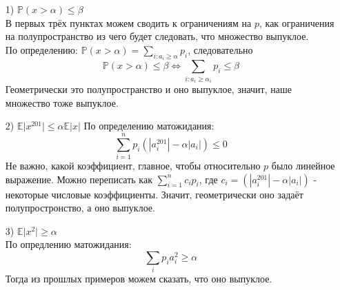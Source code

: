 \documentclass[12pt,letterpaper]{article}
\begin{document}
\begin{itemize}
	\item[1) ] $ \mathbb{P}(x > \alpha) \le \beta $\\
В первых трёх пунктах можем сводить к ограничениям на $ p $, как ограничения на полупространство из чего будет следовать, что множество выпуклое.\\
По определению: $ \mathbb{P}(x > \alpha) = \sum\limits_{i: a_i \geqslant \alpha} p_i$, следовательно 
$$
\mathbb{P}(x > \alpha) \le \beta \Leftrightarrow \sum\limits_{i: a_i \geqslant \alpha_i} p_i \le \beta
$$
Геометрически это полупространство и оно выпуклое, значит, наше множество тоже выпуклое.

	\item[2) ] $ \mathbb{E} \vert x^{201}\vert \le \alpha \mathbb{E}\vert x \vert $
По определению матожидания: 
$$
\sum\limits_{i=1}^{n} p_{i}\left(\left|a_{i}^{201}\right|-\alpha\left|a_{i}\right|\right) \leq 0
$$
Не важно, какой коэффициент, главное, чтобы относительно $ p $ было линейное выражение. Можно переписать как $ \sum\limits_{i=1}^{n} c_i p_{i}  $, где $ c_i = \left(\left|a_{i}^{201}\right|-\alpha\left|a_{i}\right|\right) $ - некоторые числовые коэффициенты. Значит, геометрически оно задаёт полупростронство, а оно выпуклое.

	\item[3) ] $ \mathbb{E} \vert x^{2}\vert \ge \alpha  $\\
По опредлению матожидания:
$$ \sum\limits_{i} p_i a_i^2 \geqslant \alpha$$
Тогда из прошлых примеров можем сказать, что оно выпуклое.


\end{itemize}
\end{document}
